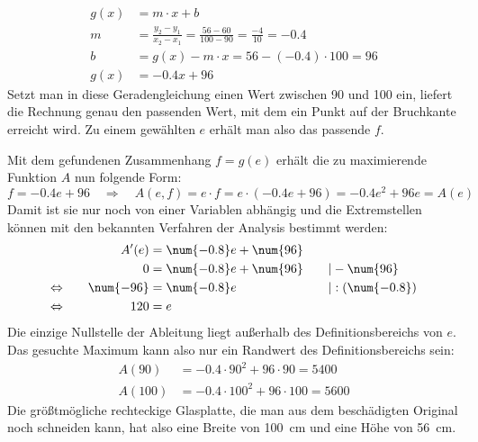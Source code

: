 \begin{exercise}
\begin{equation*}
      \begin{split}
        g(x)&=m\cdot x+b
        \\
        m&=\frac{y_2-y_1}{x_2-x_1}
          =\frac{56-60}{100-90}
          =\frac{-4}{10}
          =\num{-0.4}
        \\
        b&=g(x)-m\cdot x
          =56-(\num{-0.4})\cdot100
          =\num{96}
        \\[1ex]
        g(x)&=\num{-0.4}x+96
      \end{split}
    \end{equation*}
    Setzt man in diese Geradengleichung einen
    Wert zwischen \num{90} und \num{100} ein,
    liefert die Rechnung genau den passenden
    Wert, mit dem ein Punkt auf der Bruchkante
    erreicht wird.
    Zu einem gewählten $e$ erhält man also
    das passende $f$.
    \par
    Mit dem gefundenen Zusammenhang $f=g(e)$
    erhält die zu maximierende Funktion $A$
    nun folgende Form:
    \begin{equation*}
      f=\num{-0.4}e+\num{96}
      \quad\Rightarrow\quad
      A(e,f)=e\cdot f
            =e\cdot(\num{-0.4}e+\num{96})
            =\num{-0.4}e^2+\num{96}e
            =A(e)
    \end{equation*}
    Damit ist sie nur noch von einer Variablen
    abhängig und die Extremstellen können mit
    den bekannten Verfahren der Analysis bestimmt
    werden:
    \begin{alignat*}{3}
      \relax&\quad
      &
      A'(e)&=\num{-0.8}e+\num{96}
      &
      \quad&\relax
      \\
      \relax&\quad
      &
      0&=\num{-0.8}e+\num{96}
      &
      \quad&|-\num{96}
      \\
      \Leftrightarrow&\quad
      &
      \num{-96}&=\num{-0.8}e
      &
      \quad&|:(\num{-0.8})
      \\
      \Leftrightarrow&\quad
      &
      120&=e
      &
      \quad&\relax
    \end{alignat*}
    Die einzige Nullstelle der Ableitung liegt
    außerhalb des Definitionsbereichs von $e$.
    Das gesuchte Maximum kann also nur ein
    Randwert des Definitionsbereichs sein:
    \begin{equation*}
      \begin{split}
        A(90)&=\num{-0.4}\cdot90^2+96\cdot90=\num{5400}
        \\
        A(100)&=\num{-0.4}\cdot100^2+96\cdot100=\num{5600}
      \end{split}
    \end{equation*}
    Die größtmögliche rechteckige Glasplatte, die
    man aus dem beschädigten Original noch
    schneiden kann, hat also eine Breite von
    \SI{100}{\centi\metre} und eine Höhe von
    \SI{56}{\centi\metre}.
  \fi
\end{exercise}
